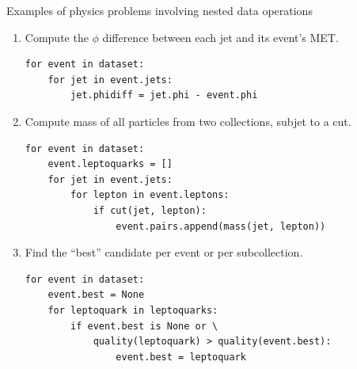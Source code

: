 \documentclass[aspectratio=169]{beamer}
\begin{document}
\begin{frame}[fragile]{Examples of physics problems involving nested data operations}
\vspace{0.15 cm}
\begin{enumerate}
\item Compute the $\phi$ difference between each jet and its event's MET.
\small
\begin{verbatim}
for event in dataset:
    for jet in event.jets:
        jet.phidiff = jet.phi - event.phi
\end{verbatim}
\normalsize

\vspace{0.1 cm}
\item<2-> Compute mass of all particles from two collections, subjet to a cut.
\small
\begin{verbatim}
for event in dataset:
    event.leptoquarks = []
    for jet in event.jets:
        for lepton in event.leptons:
            if cut(jet, lepton):
                event.pairs.append(mass(jet, lepton))
\end{verbatim}
\normalsize

\vspace{0.1 cm}
\item<3-> Find the ``best'' candidate per event or per subcollection.
\small
\begin{verbatim}
for event in dataset:
    event.best = None
    for leptoquark in leptoquarks:
        if event.best is None or \
            quality(leptoquark) > quality(event.best):
                event.best = leptoquark
\end{verbatim}
\normalsize
\end{enumerate}
\end{frame}
\end{document}
